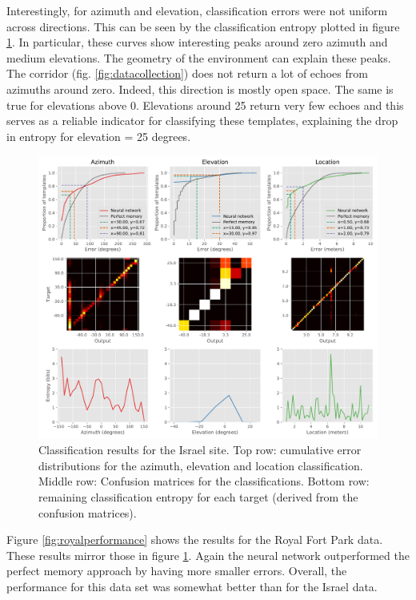 \documentclass[preprint,5p]{elsarticle}
\begin{document}
Interestingly, for azimuth and elevation, classification errors were not uniform across directions. This can be seen by the classification entropy plotted in figure \ref{fig:israelperformance}. In particular, these curves show interesting peaks around zero azimuth and medium elevations. The geometry of the environment can explain these peaks. The corridor (fig. \ref{fig:datacollection}) does not return a lot of echoes from azimuths around zero. Indeed, this direction is mostly open space. The same is true for elevations above 0. Elevations around 25 return very few echoes and this serves as a reliable indicator for classifying these templates, explaining the drop in entropy for elevation = 25 degrees.

\begin{figure}
	\centering
	\includegraphics[width=1\linewidth]{figures/israel_performance}
	\caption{Classification results for the Israel site. Top row: cumulative error distributions for the azimuth, elevation and location classification. Middle row: Confusion matrices for the classifications. Bottom row: remaining classification entropy for each target (derived from the confusion matrices).}
	\label{fig:israelperformance}
\end{figure}

Figure \ref{fig:royalperformance} shows the results for the Royal Fort Park data. These results mirror those in figure \ref{fig:israelperformance}. Again the neural network outperformed the perfect memory approach by having more smaller errors. Overall, the performance for this data set was somewhat better than for the Israel data.
\end{document}
